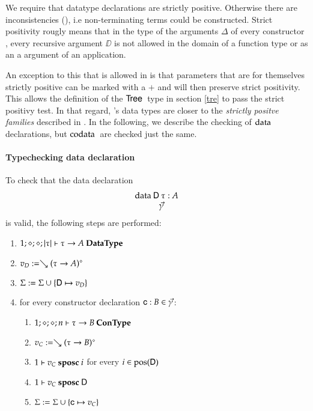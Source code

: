 We require that datatype declarations are strictly positive.
Otherwise there are inconsistencies (\cite{paulinmohring93inductive}), i.e non-terminating terms could be constructed.
Strict positivity rougly means that in the type of the arguments $\Delta$ of every constructor , every recursive argument $\DD$ is not allowed in the domain of a function type or as an a argument of an application.

An exception to this that is allowed in \mugda is that parameters that are for themselves strictly positive can be marked with a $+$ and will then preserve strict positivity. 
This allows the definition of the $\mathsf{Tree}\:$ type in section \ref{tre} to pass the strict positivy test. In that regard, \mugda 's data types are closer to the \emph{strictly positve families} described in \cite{alti:cats07}.
In the following, we describe the checking of $\mathrm{data}\:$ declarations, but $\mathrm{codata}\:$ are checked just the same.

\newcommand{\sposc}[3]{#1\vdash#2\mbox{ \textbf{sposc} }#3}
\newcommand{\spos}[3]{#1\vdash#2\mbox{ \textbf{spos} }#3}

\paragraph*{Typechecking data declaration}


To check that the data declaration
\[\begin{array}{l}
\data \DD \: \tau : A \\
\spcx \vec{\gamma}
\end{array}
\]
is valid, the following steps are performed: 
\begin{enumerate}
\item
$1;\diamond;\diamond;\vert\tau\vert\vdash \tau \rightarrow A\:\mathbf{DataType}$
\item
$v_D := \searrow (\tau \rightarrow A)^{\diamond}$
\item
$\mathrm{\Sigma} := \mathrm{\Sigma} \cup \{\mathsf{D} \mapsto v_D\}$
\item
for every constructor declaration $\mathsf{c} : B  \in \vec{\gamma}$:
\begin{enumerate} 
\item
$1;\diamond;\diamond;n\vdash\tau \rightarrow B\:\mathbf{ConType}$
\item
$v_C := \searrow (\tau \rightarrow B)^{\diamond}$
\item
$\sposc{1}{v_C}{i}$ for every $i \in \mbox{pos}(\mathsf{D}) $ 
\item
$\sposc{1}{v_C}{\DD}$
\item
$\mathrm{\Sigma} := \mathrm{\Sigma} \cup \{\mathsf{c} \mapsto v_C\}$
\end{enumerate}
\end{enumerate}

